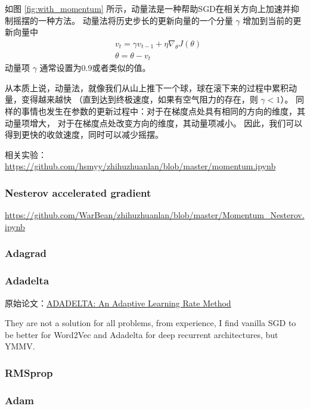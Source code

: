 \documentclass[a4paper,10pt]{ctexbook}
\begin{document}
如图 \ref{fig:with_momentum} 所示，动量法是一种帮助SGD在相关方向上加速并抑制摇摆的一种方法。
动量法将历史步长的更新向量的一个分量 $\gamma$ 增加到当前的更新向量中
\begin{align*}
    & v_t = \gamma v_{t-1} + \eta \nabla_{\theta}{J(\theta)} \\
    & \theta = \theta - v_{t}
\end{align*}
动量项 $\gamma$ 通常设置为0.9或者类似的值。

从本质上说，动量法，就像我们从山上推下一个球，球在滚下来的过程中累积动量，变得越来越快
（直到达到终极速度，如果有空气阻力的存在，则 $\gamma < 1$）。
同样的事情也发生在参数的更新过程中：对于在梯度点处具有相同的方向的维度，其动量项增大，
对于在梯度点处改变方向的维度，其动量项减小。
因此，我们可以得到更快的收敛速度，同时可以减少摇摆。


相关实验：\url{https://github.com/hsmyy/zhihuzhuanlan/blob/master/momentum.ipynb}


\subsubsection{Nesterov accelerated gradient}

\url{https://github.com/WarBean/zhihuzhuanlan/blob/master/Momentum_Nesterov.ipynb}




\subsubsection{Adagrad}




\subsubsection{Adadelta}
原始论文：\href{https://arxiv.org/abs/1212.5701}{ADADELTA: An Adaptive Learning Rate Method}


They are not a solution for all problems, from experience, I find vanilla SGD to be better for Word2Vec and Adadelta for deep recurrent architectures, but YMMV.






\subsubsection{RMSprop}
\subsubsection{Adam}
\end{document}
